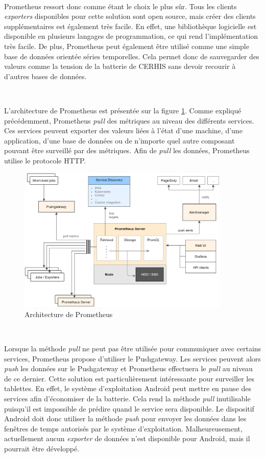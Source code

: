 ~

\noindent
Prometheus ressort donc comme étant le choix le plus sûr. Tous les clients \textit{exporters} disponibles pour cette solution sont open source, mais créer des clients supplémentaires est également très facile. En effet, une bibliothèque logicielle est disponible en plusieurs langages de programmation, ce qui rend l’implémentation très facile. De plus, Prometheus peut également être utilisé comme une simple base de données orientée séries temporelles. Cela permet donc de sauvegarder des valeurs comme la tension de la batterie de CERHIS sans devoir recourir à d’autres bases de données.

~

\noindent
L’architecture de Prometheus est présentée sur la figure \ref{fig:prom_arch}. Comme expliqué précédemment, Prometheus \textit{pull} des métriques au niveau des différents services. Ces services peuvent exporter des valeurs liées à l’état d’une machine, d’une application, d’une base de données ou de n’importe quel autre composant pouvant être surveillé par des métriques. Afin de \textit{pull} les données, Prometheus utilise le protocole HTTP.

\begin{figure}[ht!]
  \centering
  \includegraphics[width=0.9\textwidth]{img/app/prom_arch.png}
  \caption{Architecture de Prometheus}
  \label{fig:prom_arch}
\end{figure}

~

\noindent
Lorsque la méthode \textit{pull} ne peut pas être utilisée pour communiquer avec certains services, Prometheus propose d'utiliser le Pushgateway. Les services peuvent alors \textit{push} les données sur le Pushgateway et Prometheus effectuera le \textit{pull} au niveau de ce dernier. Cette solution est particulièrement intéressante pour surveiller les tablettes. En effet, le système d’exploitation Android peut mettre en pause des services afin d'économiser de la batterie. Cela rend la méthode \textit{pull} inutilisable puisqu'il est impossible de prédire quand le service sera disponible. Le dispositif Android doit donc utiliser la méthode \textit{push} pour envoyer les données dans les fenêtres de temps autorisés par le système d’exploitation. Malheureusement, actuellement aucun \textit{exporter} de données n'est disponible pour Android, mais il pourrait être développé.

